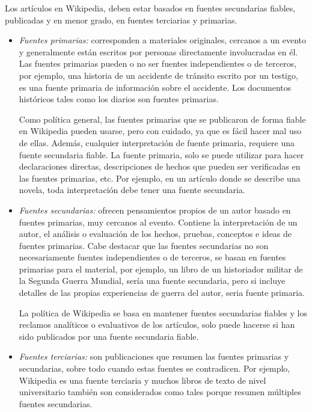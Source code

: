 \begin{itemize}
Los art\'iculos en Wikipedia, deben estar basados en fuentes secundarias fiables, publicadas y en menor grado, en fuentes terciarias y primarias.
\begin{itemize}
\item \emph{Fuentes primarias:} corresponden a materiales originales, cercanos a un evento y generalmente est\'an escritos por personas directamente involucradas en \'el. Las fuentes primarias pueden o no ser fuentes independientes o de terceros, por ejemplo, una historia de un accidente de tr\'ansito escrito por un testigo, es una fuente primaria de informaci\'on sobre el accidente. Los documentos hist\'oricos tales como los diarios son fuentes primarias.

Como pol\'itica general, las fuentes primarias que se publicaron de forma fiable en Wikipedia pueden usarse, pero con cuidado, ya que es f\'acil hacer mal uso de ellas. Adem\'as, cualquier interpretaci\'on de fuente primaria, requiere una fuente secundaria fiable. La fuente primaria, solo se puede utilizar para hacer declaraciones directas, descripciones de hechos que pueden ser verificadas en las fuentes primarias, etc. Por ejemplo, en un art\'iculo donde se describe una novela, toda interpretaci\'on debe tener una fuente secundaria.

\item \emph{Fuentes secundarias:} ofrecen pensamientos propios de un autor basado en fuentes primarias, muy cercanos al evento. Contiene la interpretaci\'on  de un autor, el an\'alisis o evaluaci\'on de los hechos, pruebas, conceptos e ideas de fuentes primarias.
Cabe destacar que las fuentes secundarias no son necesariamente fuentes independientes o de terceros, se basan en fuentes primarias para el material, por ejemplo, un libro de un historiador militar de la Segunda Guerra Mundial, ser\'ia una fuente secundaria, pero si incluye detalles de las propias experiencias de guerra del autor, seria fuente primaria.

La pol\'itica de Wikipedia se basa en mantener fuentes secundarias fiables y los reclamos anal\'iticos o evaluativos de los art\'iculos, solo puede hacerse si han sido publicados por una fuente secundaria fiable.

\item \emph{Fuentes terciarias:} son publicaciones que resumen las fuentes primarias y secundarias, sobre todo cuando estas fuentes se contradicen. Por ejemplo, Wikipedia es una fuente terciaria y muchos libros de texto de nivel universitario tambi\'en son considerados como tales porque resumen m\'ultiples fuentes secundarias.
\end{itemize}

\end{itemize}

